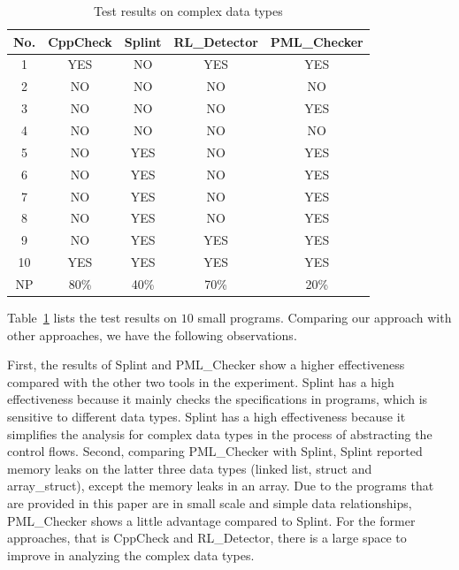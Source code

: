 \begin{table}[!h]
\center
\caption{Test results on complex data types}\label{tab:3}
\begin{tabular}{|c|c|c|c|c|}
\hline
\textbf{No.}  & \textbf{CppCheck} & \textbf{Splint} & \textbf{RL\_Detector} & \textbf{PML\_Checker}\\
\hline
1	 &	YES & NO & YES & YES\\
\hline
2  & NO & NO & NO & NO \\
\hline
3	 & NO &	NO & NO & YES\\
\hline
4		& NO &	NO & NO & NO\\
\hline
5	 & NO & YES & NO & YES\\
\hline
6	 &	NO	& YES & NO & YES\\
\hline
7	 & NO & YES & NO & YES\\
\hline
8	 & NO & YES & NO & YES\\
\hline
9	 & NO & YES & YES & YES\\
\hline
10  & YES & YES & YES & YES\\
\hline
NP & 80\% & 40\% & 70\% & 20\%\\
\hline
\end{tabular}
\end{table}


Table~\ref{tab:3} lists the test results on $10$ small programs. Comparing our approach with other approaches, we have the following observations.

First, the results of Splint and PML\_Checker show a higher effectiveness compared with the other two tools in the experiment. Splint has a high effectiveness because it mainly checks the specifications in programs, which is sensitive to different data types. Splint has a high effectiveness because it simplifies the analysis for complex data types in the process of abstracting the control flows. 
Second, comparing PML\_Checker with Splint, Splint reported memory leaks on the latter three data types (linked list, struct and array\_struct), except the memory leaks in an array. Due to the programs that are provided in this paper are in small scale and simple data relationships, PML\_Checker shows a little advantage compared to Splint. For the former approaches, that is CppCheck and RL\_Detector, there is a large space to improve in analyzing the complex data types.

